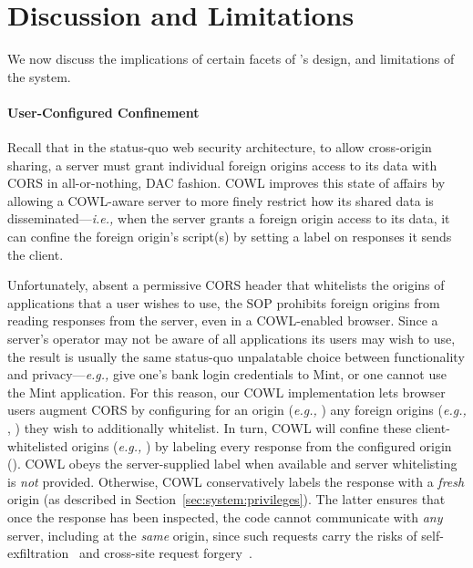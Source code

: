 \section{Discussion and Limitations}
\label{sec:discussion}

We now discuss the implications of certain facets of \sys{}'s
design, and limitations of the system.


\paragraph{User-Configured Confinement}
Recall that in the status-quo web security architecture,
to allow cross-origin sharing, a server must
grant individual foreign origins access to its data with CORS in
all-or-nothing, DAC fashion.
%
COWL improves this state of affairs by allowing a COWL-aware server to
more finely restrict how its shared data is
disseminated---\emph{i.e.,} when the server grants a foreign origin
access to its data, it can confine the foreign origin's script(s) by
setting a label on responses it sends the client.

Unfortunately, absent a permissive CORS header that whitelists the
origins of applications that a user wishes to use, the SOP
prohibits foreign origins from reading responses from the server,
even in a COWL-enabled browser.
%
Since a server's operator may not be aware of all applications its
users may wish to use, the result is usually the same status-quo
unpalatable choice between functionality and privacy---\emph{e.g.,} give
one's bank login credentials to Mint, or one cannot use the Mint
application.
%
For this reason, our COWL implementation lets browser users augment
CORS by configuring for an origin (\emph{e.g.,} ) any
foreign origins (\emph{e.g.,} , )
they wish to additionally whitelist.
%
In turn, COWL will confine these client-whitelisted origins (\emph{e.g.,}
) by labeling every response from the configured
origin ().
%
COWL obeys the server-supplied label when available and server
whitelisting is \emph{not} provided. Otherwise, COWL conservatively
labels the response with a \emph{fresh} origin (as described in
Section~\ref{sec:system:privileges}). The latter ensures that once the
response has been inspected, the code cannot communicate with
\emph{any} server, including at the \emph{same} origin, since such
requests carry the risks of self-exfiltration~\cite{selfex} and
cross-site request forgery~\cite{CSRF}.
%


